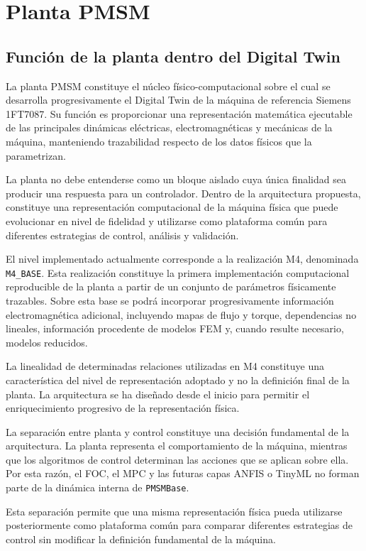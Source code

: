 \section{Planta PMSM}

\subsection{Función de la planta dentro del Digital Twin}

La planta PMSM constituye el núcleo físico-computacional sobre el cual se desarrolla progresivamente el Digital Twin de la máquina de referencia Siemens 1FT7087. Su función es proporcionar una representación matemática ejecutable de las principales dinámicas eléctricas, electromagnéticas y mecánicas de la máquina, manteniendo trazabilidad respecto de los datos físicos que la parametrizan.

La planta no debe entenderse como un bloque aislado cuya única finalidad sea producir una respuesta para un controlador. Dentro de la arquitectura propuesta, constituye una representación computacional de la máquina física que puede evolucionar en nivel de fidelidad y utilizarse como plataforma común para diferentes estrategias de control, análisis y validación.

El nivel implementado actualmente corresponde a la realización M4, denominada \texttt{M4\_BASE}. Esta realización constituye la primera implementación computacional reproducible de la planta a partir de un conjunto de parámetros físicamente trazables. Sobre esta base se podrá incorporar progresivamente información electromagnética adicional, incluyendo mapas de flujo y torque, dependencias no lineales, información procedente de modelos FEM y, cuando resulte necesario, modelos reducidos.

La linealidad de determinadas relaciones utilizadas en M4 constituye una característica del nivel de representación adoptado y no la definición final de la planta. La arquitectura se ha diseñado desde el inicio para permitir el enriquecimiento progresivo de la representación física.

La separación entre planta y control constituye una decisión fundamental de la arquitectura. La planta representa el comportamiento de la máquina, mientras que los algoritmos de control determinan las acciones que se aplican sobre ella. Por esta razón, el FOC, el MPC y las futuras capas ANFIS o TinyML no forman parte de la dinámica interna de \texttt{PMSMBase}.

Esta separación permite que una misma representación física pueda utilizarse posteriormente como plataforma común para comparar diferentes estrategias de control sin modificar la definición fundamental de la máquina.

